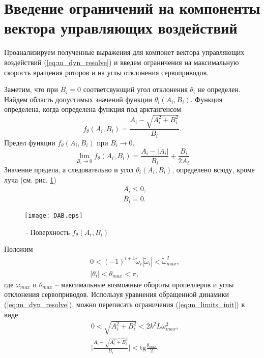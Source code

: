 \section{Введение ограничений на компоненты вектора управляющих воздействий}
\label{section:limits}

Проанализируем полученные выражения для компонет вектора управляющих воздействий (\ref{eq:m_dyn_resolve}) и введем ограничения на максимальную скорость вращения роторов и на углы отклонения сервоприводов.

Заметим, что при $B_i = 0$ соответсвующий угол отклонения $\theta_i$ не определен. Найдем область допустимых значений функции $\theta_i(A_i, B_i)$.
Функция определена, когда определена функция под арктангенсом
\begin{equation}
f_{\theta}(A_i, B_i) = \frac{A_i-\sqrt{A^2_i +  B^2_i}}{B_i}.
\end{equation}
Предел функции $f_{\theta}(A_i, B_i)$ при $B_i \to 0$.
\begin{equation}
\lim_{B_i \to 0} f_{\theta}(A_i, B_i) =
\frac{{A_i} - |A_i|}{B_i} + 
\frac{B_i}{2A_i}
\end{equation}
Значение предела, а следовательно и угол $\theta_i(A_i, B_i)$, определено всюду, кроме луча (см. рис. \ref{fig:f_th})
\begin{equation} \label{m_theta_exists}
\begin{aligned}
&A_i \leq 0, \\
&B_i = 0.
\end{aligned}
\end{equation}
\begin{figure}[h!]
	\centering
	\texttt{[image: DAB.eps]}
	\caption{ -- Поверхность $f_{\theta}(A_i, B_i)$}
	\label{fig:f_th}
\end{figure}
Положим 
\begin{equation} \label{eq:m_limits_init}
\begin{aligned}
&0< (-1)^{i+1} \tilde \omega_i |\tilde\omega_i| < \tilde \omega_{max}^2,
\\
&|\theta_i| < \theta_{max} < \pi,
\end{aligned}
\end{equation}
где $\omega_{max}$ и $\theta_{max}$ -- максимальные возможные обороты пропеллеров и углы отклонения сервоприводов.
Используя уравнения обращенной динамики (\ref{eq:m_dyn_resolve}), можно переписать ограничения (\ref{eq:m_limits_init}) в виде
\begin{equation} \label{eq:m_limits_AB}
\begin{aligned}
&0 <
\sqrt{A^2_i +  B^2_i}
< 2 k^2 L\omega_{max}^2,
\\
&\Bigg|\frac{A_i-\sqrt{A^2_i +  B^2_i}}{B_i}\Bigg| < 
\text{tg}\frac{\theta_{max}}{2}.
\end{aligned}
\end{equation}
